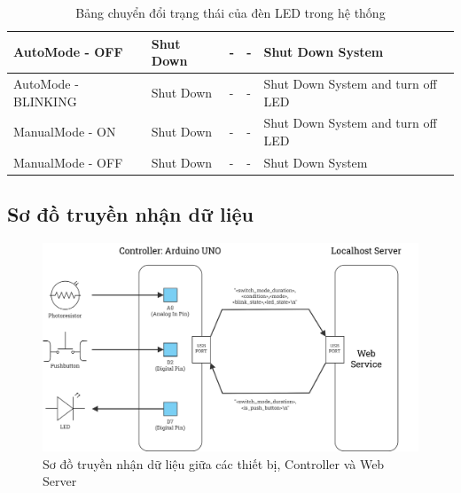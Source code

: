 \begin{table}[H]
\begin{tabular}{|p{2.3cm}|p{3cm}|p{4cm}|p{2cm}|p{4cm}|}
AutoMode - OFF                                                      & Shut Down                                                  & -                                                              & -                                                               & Shut Down System                          \\ \hline
AutoMode - BLINKING                                                 & Shut Down                                                  & -                                                              & -                                                               & Shut Down System and turn off LED         \\ \hline
ManualMode - ON                                                     & Shut Down                                                  & -                                                              & -                                                               & Shut Down System and turn off LED         \\ \hline
ManualMode - OFF                                                    & Shut Down                                                  & -                                                              & -                                                               & Shut Down System                          \\ \hline
\end{tabular}
\caption{Bảng chuyển đổi trạng thái của đèn LED trong hệ thống}
\label{tab:my_label}
\end{table}

\subsection{Sơ đồ truyền nhận dữ liệu}
\begin{figure}[H]
    \centering
    \includegraphics[scale=0.19]{img/Data.jpg}
    \caption{Sơ đồ truyền nhận dữ liệu giữa các thiết bị, Controller và Web Server}
    \label{fig:my_label}
\end{figure}

